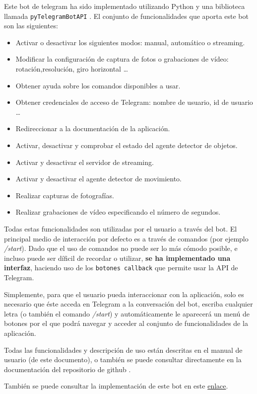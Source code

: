 Este bot de telegram ha sido implementado utilizando Python y una biblioteca llamada \texttt{pyTelegramBotAPI} \cite{ref13}. El conjunto de funcionalidades que aporta este bot son las siguientes:

\begin{itemize}
\item Activar o desactivar los siguientes modos: manual, automático o streaming.
\item Modificar la configuración de captura de fotos o grabaciones de vídeo: rotación,resolución, giro horizontal \ldots
\item Obtener ayuda sobre los comandos disponibles a usar.
\item Obtener credenciales de acceso de Telegram: nombre de usuario, id de usuario \ldots
\item Redireccionar a la documentación de la aplicación.
\item Activar, desactivar y comprobar el estado del agente detector de objetos.
\item Activar y desactivar el servidor de streaming.
\item Activar y desactivar el agente detector de movimiento.
\item Realizar capturas de fotografías.
\item Realizar grabaciones de vídeo especificando el número de segundos.
\end{itemize}

Todas estas funcionalidades son utilizadas por el usuario a través del bot. El principal medio de interacción por defecto es a través de comandos (por ejemplo \textit{/start}). Dado que el uso de comandos no puede ser lo más cómodo posible, e incluso puede ser díficil de recordar o utilizar, \textbf{se ha implementado una interfaz}, haciendo uso de los \texttt{botones callback} que permite usar la API de Telegram.

Simplemente, para que el usuario pueda interaccionar con la aplicación, solo es necesario que éste acceda en Telegram a la conversación del bot, escriba cualquier letra (o también el comando \textit{/start}) y automáticamente le aparecerá un menú de botones por el que podrá navegar y acceder al conjunto de funcionalidades de la aplicación.

Todas las funcionalidades y descripción de uso están descritas en el manual de usuario (de este documento), o también se puede consultar directamente en la documentación del repositorio de github \cite{ref1}.

También se puede consultar la implementación de este bot en este \href{https://github.com/jmv74211/TFM_security_system_PI/blob/master/src/agents/telegram_bot.py}{enlace}.
